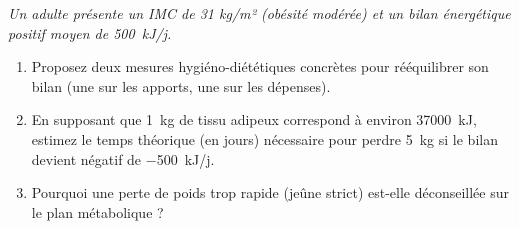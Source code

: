 \documentclass[11pt]{article}
\begin{document}
\begin{exercice}
\emph{Un adulte présente un IMC de 31 kg/m² (obésité modérée) et un bilan énergétique positif moyen de \SI{+500}{kJ/j}.}
\begin{enumerate}
    \item Proposez deux mesures hygiéno-diététiques concrètes pour rééquilibrer son bilan (une sur les apports, une sur les dépenses).
    \item En supposant que \SI{1}{kg} de tissu adipeux correspond à environ \SI{37000}{kJ}, estimez le temps théorique (en jours) nécessaire pour perdre \SI{5}{kg} si le bilan devient négatif de \SI{-500}{kJ/j}.
    \item Pourquoi une perte de poids trop rapide (jeûne strict) est-elle déconseillée sur le plan métabolique ?
\end{enumerate}
\end{exercice}
\end{document}
